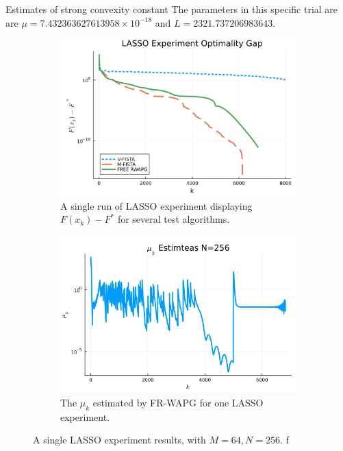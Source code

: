 \documentclass[11pt]{beamer}
\theoremstyle{definition}
\begin{document}
        \begin{frame}{Estimates of strong convexity constant}
            The parameters in this specific trial are are $\mu = 7.432363627613958\times 10^{-18}$ and $L = 2321.737206983643$. 
            \begin{figure}[H]
                \begin{subfigure}[b]{0.47\textwidth}
                    \includegraphics[width=\textwidth]{assets/lasso_loss_256.png}
                    \caption
                    {A single run of LASSO experiment displaying $F(x_k) - F^*$ for several test algorithms.
                    }
                \end{subfigure}
                \hfill
                \begin{subfigure}[b]{0.47\textwidth}
                    \includegraphics[width=\textwidth]{assets/lasso_sc_estimates_256.png}
                    \caption{The $\mu_k$ estimated by FR-WAPG for one LASSO experiment. }
                \end{subfigure}
                \caption{A single LASSO experiment results, with $M = 64, N=256$. f}
                \label{fig:single-lass-mu-estimates}
            \end{figure}
        \end{frame}
\end{document}
